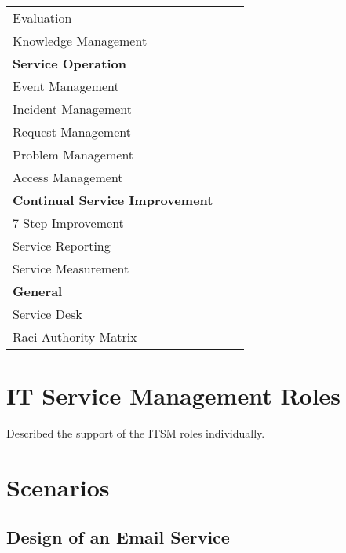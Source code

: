 \begin{table}[h!]
\begin{tabular}{|p{6.1cm}|p{4.5cm}|p{4.5cm}|}
Evaluation                   &                                &\\
Knowledge Management                   &                                &\\\hline
\textbf{Service Operation}          &                                &\\
Event Management                   &                                &\\
Incident Management                   &                                &\\
Request Management                   &                                &\\
Problem Management                   &                                &\\
Access Management                   &                                &\\\hline
\textbf{Continual Service Improvement}          &                                &\\
7-Step Improvement                   &                                &\\
Service Reporting                   &                                &\\
Service Measurement                 &                                &\\\hline
\textbf{General}                   &                                 &\\
Service Desk                       &                                 &\\
Raci Authority Matrix                    &                           &\\\hline
\end{tabular}
\label{tab:SupportedITSMProcesses}
\end{table}

\section{IT Service Management Roles}
\label{sec:ITSMRoles}

Described the support of the ITSM roles individually.

\section{Scenarios}
\label{sec:scenarios}

\subsection{Design of an Email Service}
\label{sec:emailServiceDesign}

